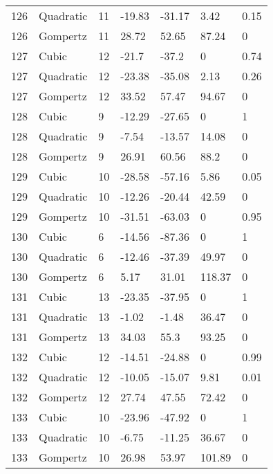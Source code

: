 \documentclass[11pt]{article}
\begin{document}
\begin{center}
\begin{longtable}{lllllll}
    126 & Quadratic & 11              & -19.83  & -31.17  & 3.42    & 0.15 \\
    126 & Gompertz  & 11              & 28.72   & 52.65   & 87.24   & 0    \\
    127 & Cubic     & 12              & -21.7   & -37.2   & 0       & 0.74 \\
    127 & Quadratic & 12              & -23.38  & -35.08  & 2.13    & 0.26 \\
    127 & Gompertz  & 12              & 33.52   & 57.47   & 94.67   & 0    \\
    128 & Cubic     & 9               & -12.29  & -27.65  & 0       & 1    \\
    128 & Quadratic & 9               & -7.54   & -13.57  & 14.08   & 0    \\
    128 & Gompertz  & 9               & 26.91   & 60.56   & 88.2    & 0    \\
    129 & Cubic     & 10              & -28.58  & -57.16  & 5.86    & 0.05 \\
    129 & Quadratic & 10              & -12.26  & -20.44  & 42.59   & 0    \\
    129 & Gompertz  & 10              & -31.51  & -63.03  & 0       & 0.95 \\
    130 & Cubic     & 6               & -14.56  & -87.36  & 0       & 1    \\
    130 & Quadratic & 6               & -12.46  & -37.39  & 49.97   & 0    \\
    130 & Gompertz  & 6               & 5.17    & 31.01   & 118.37  & 0    \\
    131 & Cubic     & 13              & -23.35  & -37.95  & 0       & 1    \\
    131 & Quadratic & 13              & -1.02   & -1.48   & 36.47   & 0    \\
    131 & Gompertz  & 13              & 34.03   & 55.3    & 93.25   & 0    \\
    132 & Cubic     & 12              & -14.51  & -24.88  & 0       & 0.99 \\
    132 & Quadratic & 12              & -10.05  & -15.07  & 9.81    & 0.01 \\
    132 & Gompertz  & 12              & 27.74   & 47.55   & 72.42   & 0    \\
    133 & Cubic     & 10              & -23.96  & -47.92  & 0       & 1    \\
    133 & Quadratic & 10              & -6.75   & -11.25  & 36.67   & 0    \\
    133 & Gompertz  & 10              & 26.98   & 53.97   & 101.89  & 0    \\

\end{longtable}
\end{center}
\end{document}
